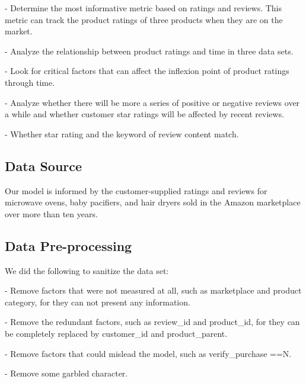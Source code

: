\documentclass{mcmthesis}
\begin{document}
- Determine the most informative metric based on ratings and reviews. This metric can track the product ratings of three products when they are on the market.

- Analyze the relationship between product ratings and time in three data sets.

- Look for critical factors that can affect the inflexion point of product ratings through time.

- Analyze whether there will be more a series of positive or negative reviews over a while and whether customer star ratings will be affected by recent reviews.

- Whether star rating and the keyword of review content match.
\subsection{Data Source}
Our model is informed by the customer-supplied ratings and reviews for microwave ovens, baby pacifiers, and hair dryers sold in the Amazon marketplace over more than ten years.
\subsection{Data Pre-processing}
We did the following to sanitize the data set:

- Remove factors that were not measured at all, such as marketplace and product category, for they can not present any information.

- Remove the redundant factors, such as review\_id and product\_id, for they can be completely replaced by customer\_id and product\_parent.

- Remove factors that could mislead the model, such as verify\_purchase ==N.

- Remove some garbled character.
\end{document}
